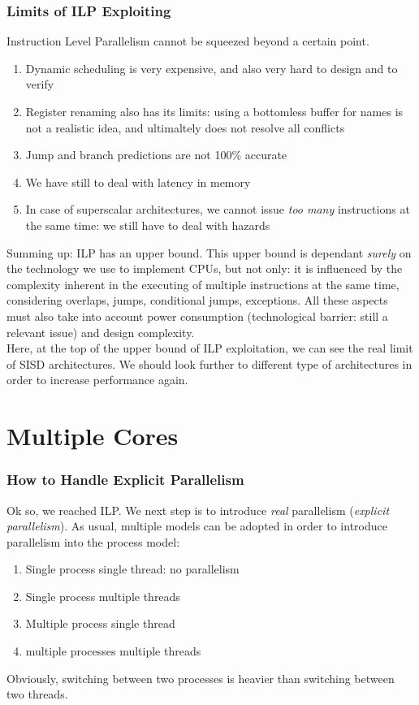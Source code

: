 \documentclass[10pt,a4paper]{article}
\begin{document}
		\section{Limits of ILP Exploiting}
			Instruction Level Parallelism cannot be squeezed beyond a certain point.
			\begin{enumerate}
				\item Dynamic scheduling is very expensive, and also very hard to design and to verify
				\item Register renaming also has its limits: using a bottomless buffer for names is not a realistic idea, and ultimaltely does not resolve all conflicts
				\item Jump and branch predictions are not 100\% accurate
				\item We have still to deal with latency in memory
				\item In case of superscalar architectures, we cannot issue \emph{too many} instructions at the same time: we still have to deal with hazards
			\end{enumerate}
			Summing up: ILP has an upper bound. This upper bound is dependant \emph{surely} on the technology we use to implement CPUs, but not only: it is influenced by the complexity inherent in the executing of multiple instructions at the same time, considering overlaps, jumps, conditional jumps, exceptions. All these aspects must also take into account power consumption (technological barrier: still a relevant issue) and design complexity.\\
			Here, at the top of the upper bound of ILP exploitation, we can see the real limit of SISD architectures. We should look further to different type of architectures in order to increase performance again.
			
	\part{Multiple Cores}
		\section{How to Handle Explicit Parallelism}
			Ok so, we reached ILP. We next step is to introduce \emph{real} parallelism (\emph{explicit parallelism}). As usual, multiple models can be adopted in order to introduce parallelism into the process model:
			\begin{enumerate}
				\item Single process single thread: no parallelism
				\item Single process multiple threads
				\item Multiple process single thread
				\item multiple processes multiple threads
			\end{enumerate}
			Obviously, switching between two processes is heavier than switching between two threads. 
			
\end{document}
